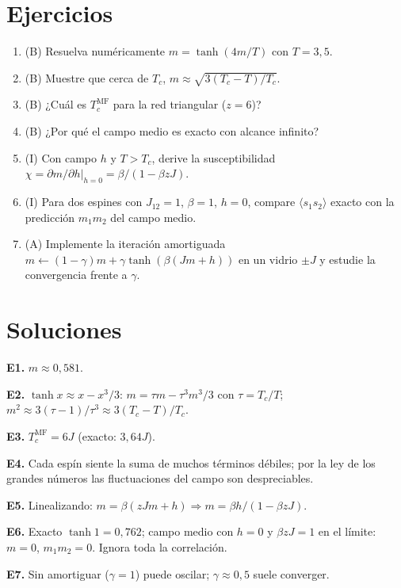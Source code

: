 \documentclass[11pt,a4paper]{article}
\begin{document}
\section{Ejercicios}
\begin{enumerate}[label=\textbf{E\arabic*.}]
\item (B) Resuelva numéricamente $m=\tanh(4m/T)$ con $T=3{,}5$.
\item (B) Muestre que cerca de $T_c$, $m\approx\sqrt{3(T_c-T)/T_c}$.
\item (B) ¿Cuál es $T_c^{\text{MF}}$ para la red triangular ($z=6$)?
\item (B) ¿Por qué el campo medio es exacto con alcance infinito?
\item (I) Con campo $h$ y $T>T_c$, derive la susceptibilidad $\chi=\partial m/\partial h|_{h=0}=\beta/(1-\beta zJ)$.
\item (I) Para dos espines con $J_{12}=1$, $\beta=1$, $h=0$, compare $\langle s_1s_2\rangle$ exacto con la predicción $m_1m_2$ del campo medio.
\item (A) Implemente la iteración amortiguada $m\leftarrow(1-\gamma)m+\gamma\tanh(\beta(Jm+h))$ en un vidrio $\pm J$ y estudie la convergencia frente a $\gamma$.
\end{enumerate}
\section{Soluciones}
\begin{solucion}
\textbf{E1.} $m\approx0{,}581$.

\textbf{E2.} $\tanh x\approx x-x^3/3$: $m=\tau m-\tau^3m^3/3$ con $\tau=T_c/T$; $m^2\approx3(\tau-1)/\tau^3\approx3(T_c-T)/T_c$.

\textbf{E3.} $T_c^{\text{MF}}=6J$ (exacto: $3{,}64J$).

\textbf{E4.} Cada espín siente la suma de muchos términos débiles; por la ley de los grandes números las fluctuaciones del campo son despreciables.

\textbf{E5.} Linealizando: $m=\beta(zJm+h)\Rightarrow m=\beta h/(1-\beta zJ)$.

\textbf{E6.} Exacto $\tanh1=0{,}762$; campo medio con $h=0$ y $\beta zJ=1$ en el límite: $m=0$, $m_1m_2=0$. Ignora toda la correlación.

\textbf{E7.} Sin amortiguar ($\gamma=1$) puede oscilar; $\gamma\approx0{,}5$ suele converger.
\end{solucion}
\end{document}
